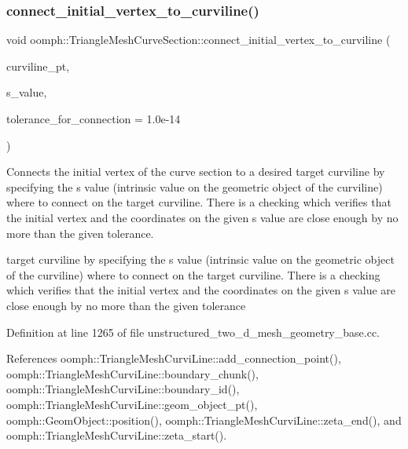 \subsubsection{\texorpdfstring{connect\+\_\+initial\+\_\+vertex\+\_\+to\+\_\+curviline()}{connect\_initial\_vertex\_to\_curviline()}}
{\footnotesize\ttfamily void oomph\+::\+Triangle\+Mesh\+Curve\+Section\+::connect\+\_\+initial\+\_\+vertex\+\_\+to\+\_\+curviline (\begin{DoxyParamCaption}\item[{\hyperlink{classoomph_1_1TriangleMeshCurviLine}{Triangle\+Mesh\+Curvi\+Line} $\ast$}]{curviline\+\_\+pt,  }\item[{const double \&}]{s\+\_\+value,  }\item[{const double \&}]{tolerance\+\_\+for\+\_\+connection = {\ttfamily 1.0e-\/14} }\end{DoxyParamCaption})}



Connects the initial vertex of the curve section to a desired target curviline by specifying the s value (intrinsic value on the geometric object of the curviline) where to connect on the target curviline. There is a checking which verifies that the initial vertex and the coordinates on the given s value are close enough by no more than the given tolerance. 

target curviline by specifying the s value (intrinsic value on the geometric object of the curviline) where to connect on the target curviline. There is a checking which verifies that the initial vertex and the coordinates on the given s value are close enough by no more than the given tolerance 

Definition at line 1265 of file unstructured\+\_\+two\+\_\+d\+\_\+mesh\+\_\+geometry\+\_\+base.\+cc.



References oomph\+::\+Triangle\+Mesh\+Curvi\+Line\+::add\+\_\+connection\+\_\+point(), oomph\+::\+Triangle\+Mesh\+Curvi\+Line\+::boundary\+\_\+chunk(), oomph\+::\+Triangle\+Mesh\+Curvi\+Line\+::boundary\+\_\+id(), oomph\+::\+Triangle\+Mesh\+Curvi\+Line\+::geom\+\_\+object\+\_\+pt(), oomph\+::\+Geom\+Object\+::position(), oomph\+::\+Triangle\+Mesh\+Curvi\+Line\+::zeta\+\_\+end(), and oomph\+::\+Triangle\+Mesh\+Curvi\+Line\+::zeta\+\_\+start().

\mbox{\label{classoomph_1_1TriangleMeshCurveSection_a32e53dc2a830784397230e92f73f6191}} 
